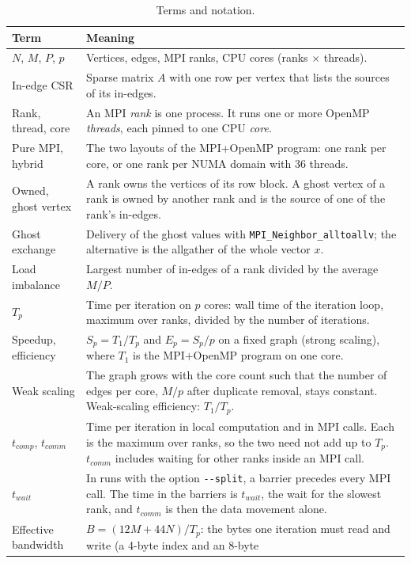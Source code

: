 \documentclass[11pt,a4paper]{article}
\newcommand{\code}[1]{\texttt{#1}}
\begin{document}
\begin{table}[tb]
\centering\small
\caption{Terms and notation.}
\label{tab:terms}
\begin{tabularx}{\textwidth}{@{}>{\raggedright\arraybackslash}p{3.5cm} >{\raggedright\arraybackslash}X@{}}
\toprule
Term & Meaning \\
\midrule
$N$, $M$, $P$, $p$ & Vertices, edges, MPI ranks, CPU cores (ranks $\times$ threads). \\
In-edge CSR & Sparse matrix $A$ with one row per vertex that lists the sources of its in-edges. \\
Rank, thread, core & An MPI \emph{rank} is one process. It runs one or more OpenMP \emph{threads}, each pinned to
  one CPU \emph{core}. \\
Pure MPI, hybrid & The two layouts of the MPI+OpenMP program: one rank per core, or one rank per NUMA domain with
  36 threads. \\
Owned, ghost vertex & A rank owns the vertices of its row block. A ghost vertex of a rank is owned by another rank
  and is the source of one of the rank's in-edges. \\
Ghost exchange & Delivery of the ghost values with \code{MPI\_Neighbor\_alltoallv}; the alternative is the
  allgather of the whole vector $x$. \\
Load imbalance & Largest number of in-edges of a rank divided by the average $M/P$. \\
$T_p$ & Time per iteration on $p$ cores: wall time of the iteration loop, maximum over ranks, divided by the number
  of iterations. \\
Speedup, efficiency & $S_p=T_1/T_p$ and $E_p=S_p/p$ on a fixed graph (strong scaling), where $T_1$ is the
  MPI+OpenMP program on one core. \\
Weak scaling & The graph grows with the core count such that the number of edges per core, $M/p$ after duplicate
  removal, stays constant. Weak-scaling efficiency: $T_1/T_p$. \\
$t_{comp}$, $t_{comm}$ & Time per iteration in local computation and in MPI calls. Each is the maximum over ranks,
  so the two need not add up to $T_p$. $t_{comm}$ includes waiting for other ranks inside an MPI call. \\
$t_{wait}$ & In runs with the option \code{-{}-split}, a barrier precedes every MPI call. The time in the barriers is
  $t_{wait}$, the wait for the slowest rank, and $t_{comm}$ is then the data movement alone. \\
Effective bandwidth & $B=(12M+44N)/T_p$: the bytes one iteration must read and write (a 4-byte index and an 8-byte

\end{tabularx}
\end{table}
\end{document}
